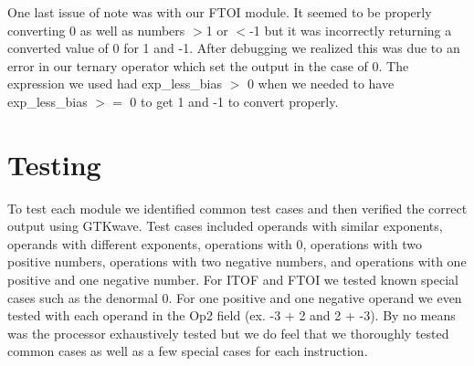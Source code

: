 \documentclass{article}
\begin{document}
\begin{multicols}{2}
One last issue of note was with our FTOI module. It seemed to be properly converting 0 as well as numbers $>$1 or $<$-1 but it was incorrectly returning a converted value of 0 for 1 and -1. After debugging we realized this was due to an error in our ternary operator which set the output in the case of 0. The expression we used had exp\_less\_bias $>$ 0 when we needed to have exp\_less\_bias $>=$ 0 to get 1 and -1 to convert properly.
  
  \section{Testing}
To test each module we identified common test cases and then verified the correct output using GTKwave. Test cases included operands with similar exponents, operands with different exponents, operations with 0, operations with two positive numbers, operations with two negative numbers, and operations with one positive and one negative number. For ITOF and FTOI we tested known special cases such as the denormal 0. For one positive and one negative operand we even tested with each operand in the Op2 field (ex. -3 + 2 and 2 + -3). By no means was the processor exhaustively tested but we do feel that we thoroughly tested common cases as well as a few special cases for each instruction.

  
\end{multicols}
\end{document}
